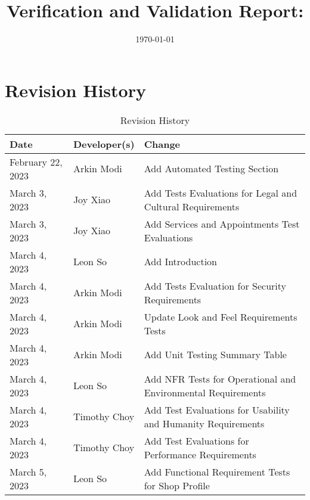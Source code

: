 \documentclass[12pt, titlepage]{article}
\begin{document}
\title{Verification and Validation Report: \progname}
\author{\authname}
\date{\today}

\maketitle


\section{Revision History}

\begin{table}[hp]
	\caption{Revision History} \label{TblRevisionHistory}
	\begin{tabularx}{\textwidth}{llX}
		\toprule
		\textbf{Date}     & \textbf{Developer(s)} & \textbf{Change}                                                   \\
		\midrule
		February 22, 2023 & Arkin Modi            & Add Automated Testing Section                                     \\
		March 3, 2023     & Joy Xiao              & Add Tests Evaluations for Legal and Cultural Requirements         \\
		March 3, 2023     & Joy Xiao              & Add Services and Appointments Test Evaluations                    \\
		March 4, 2023     & Leon So               & Add Introduction                                                  \\
		March 4, 2023     & Arkin Modi            & Add Tests Evaluation for Security Requirements                    \\
		March 4, 2023     & Arkin Modi            & Update Look and Feel Requirements Tests                           \\
		March 4, 2023     & Arkin Modi            & Add Unit Testing Summary Table                                    \\
		March 4, 2023     & Leon So               & Add NFR Tests for Operational and Environmental Requirements      \\
		March 4, 2023     & Timothy Choy          & Add Test Evaluations for Usability and Humanity Requirements      \\
		March 4, 2023     & Timothy Choy          & Add Test Evaluations for Performance Requirements                 \\
		March 5, 2023     & Leon So               & Add Functional Requirement Tests for Shop Profile                 \\

\end{tabularx}
\end{table}
\end{document}
